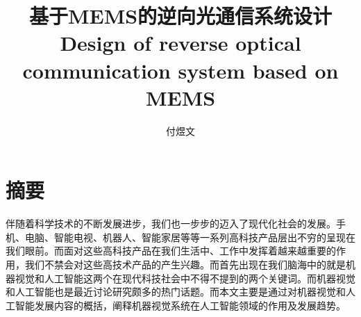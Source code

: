 \confidential{}%
\title{基于MEMS的逆向光通信系统设计\\Design of reverse optical communication system based on MEMS}%
\author{付煜文}%
\advisorsec{}%
\maketitle%
\makeenglishtitle%
\makedeclaration%
\chapter[摘要]{摘\quad 要}%
\setcounter{page}{1}%
伴随着科学技术的不断发展进步，我们也一步步的迈入了现代化社会的发展。手机、电脑、智能电视、机器人、智能家居等等一系列高科技产品层出不穷的呈现在我们眼前。而面对这些高科技产品在我们生活中、工作中发挥着越来越重要的作用，我们不禁会对这些高技术产品的产生兴趣。而首先出现在我们脑海中的就是机器视觉和人工智能这两个在现代科技社会中不得不提到的两个关键词。而机器视觉和人工智能也是最近讨论研究颇多的热门话题。而本文主要是通过对机器视觉和人工智能发展内容的概括，阐释机器视觉系统在人工智能领域的作用及发展趋势。




